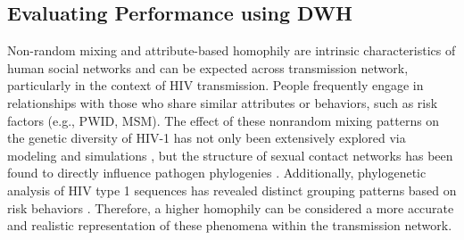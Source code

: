 \documentclass[utf8]{FrontiersinHarvard} %
\begin{document}



\subsection{Evaluating Performance using DWH}

Non-random mixing and attribute-based homophily are intrinsic characteristics
of human social networks and can be expected across transmission network,
particularly in the context of HIV transmission. People frequently engage in
relationships with those who share similar attributes or behaviors, such as
risk factors (e.g., PWID, MSM). The effect of these nonrandom mixing patterns
on the genetic diversity of HIV-1 has not only been extensively explored via
modeling and simulations \citep{goodreau_assessing_2006}, but the structure of
sexual contact networks has been found to directly influence pathogen
phylogenies \citep{robinson_how_2013}. Additionally, phylogenetic analysis of
HIV type 1 sequences has revealed distinct grouping patterns based on risk
behaviors \citep{holmes_molecular_1995}. Therefore, a higher homophily can be
considered a more accurate and realistic representation of these phenomena
within the transmission network.
\end{document}
